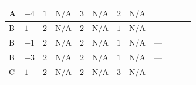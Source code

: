 \documentclass[8pt]{article}
\begin{document}
\begin{landscape}
\begin{longtable}{@{}llcccccc >{\raggedright\arraybackslash}p{0.21\linewidth} >{\raggedright\arraybackslash}p{0.21\linewidth} >{\raggedright\arraybackslash}p{0.21\linewidth}@{}}
\midrule
A & $-4$ & $1$ & $\text{N/A}$ & $3$ & $\text{N/A}$ & $2$ & $\text{N/A}$ & \scriptsize\adjustbox{max width=\linewidth}{$\begin{gathered} -\frac{51 {g_1}^2 {\lambda_{HS_1}^{(1)}}}{2}\end{gathered}$} & \scriptsize\adjustbox{max width=\linewidth}{$\begin{gathered} +6 {\lambda_{12}^{(1)}} {\lambda_{HS_2}^{(1)}}\end{gathered}$} & \scriptsize\adjustbox{max width=\linewidth}{$\begin{gathered} +6 {\lambda_1} {\lambda_{HS_1}^{(1)}}\end{gathered}$} \\
\midrule
B & $1$ & $2$ & $\text{N/A}$ & $2$ & $\text{N/A}$ & $1$ & $\text{N/A}$ & --- & \scriptsize\adjustbox{max width=\linewidth}{$\begin{gathered} +4 {\lambda_{12}^{(1)}} {\lambda_{HS_2}^{(1)}}\end{gathered}$} & \scriptsize\adjustbox{max width=\linewidth}{$\begin{gathered} +6 {\lambda_1} {\lambda_{HS_1}^{(1)}}\end{gathered}$} \\
\midrule
B & $-1$ & $2$ & $\text{N/A}$ & $2$ & $\text{N/A}$ & $1$ & $\text{N/A}$ & --- & \scriptsize\adjustbox{max width=\linewidth}{$\begin{gathered} +4 {\lambda_{12}^{(1)}} {\lambda_{HS_2}^{(1)}}\end{gathered}$} & \scriptsize\adjustbox{max width=\linewidth}{$\begin{gathered} +6 {\lambda_1} {\lambda_{HS_1}^{(1)}}\end{gathered}$} \\
\midrule
B & $-3$ & $2$ & $\text{N/A}$ & $2$ & $\text{N/A}$ & $1$ & $\text{N/A}$ & --- & \scriptsize\adjustbox{max width=\linewidth}{$\begin{gathered} +4 {\lambda_{12}^{(1)}} {\lambda_{HS_2}^{(1)}}\end{gathered}$} & \scriptsize\adjustbox{max width=\linewidth}{$\begin{gathered} +6 {\lambda_1} {\lambda_{HS_1}^{(1)}}\end{gathered}$} \\
\midrule
C & $1$ & $2$ & $\text{N/A}$ & $2$ & $\text{N/A}$ & $3$ & $\text{N/A}$ & --- & \scriptsize\adjustbox{max width=\linewidth}{$\begin{gathered} +4 {\lambda_{12}^{(1)}} {\lambda_{HS_2}^{(1)}}\end{gathered}$} & \scriptsize\adjustbox{max width=\linewidth}{$\begin{gathered} +6 {\lambda_1} {\lambda_{HS_1}^{(1)}}\end{gathered}$} \\

\end{longtable}
\end{landscape}
\end{document}
